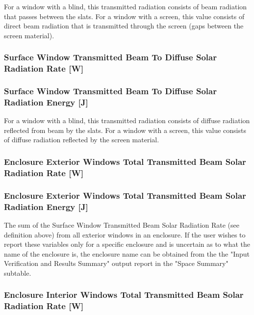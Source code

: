 For a window with a blind, this transmitted radiation consists of beam radiation that passes between the slats. For a window with a screen, this value consists of direct beam radiation that is transmitted through the screen (gaps between the screen material).

\subsubsection{Surface Window Transmitted Beam To Diffuse Solar Radiation Rate {[}W{]}}\label{surface-window-transmitted-beam-to-diffuse-solar-radiation-rate-w}

\subsubsection{Surface Window Transmitted Beam To Diffuse Solar Radiation Energy {[}J{]}}\label{surface-window-transmitted-beam-to-diffuse-solar-radiation-energy-j}

For a window with a blind, this transmitted radiation consists of diffuse radiation reflected from beam by the slats. For a window with a screen, this value consists of diffuse radiation reflected by the screen material.

\subsubsection{Enclosure Exterior Windows Total Transmitted Beam Solar Radiation Rate {[}W{]}}\label{zone-exterior-windows-total-transmitted-beam-solar-radiation-rate-w}

\subsubsection{Enclosure Exterior Windows Total Transmitted Beam Solar Radiation Energy {[}J{]}}\label{zone-exterior-windows-total-transmitted-beam-solar-radiation-energy-j}

The sum of the Surface Window Transmitted Beam Solar Radiation Rate (see definition above) from all exterior windows in an enclosure. If the user wishes to report these variables only for a specific enclosure and is uncertain as to what the name of the enclosure is, the enclosure name can be obtained from the the "Input Verification and Results Summary" output report in the "Space Summary" subtable.

\subsubsection{Enclosure Interior Windows Total Transmitted Beam Solar Radiation Rate {[}W{]}}\label{zone-interior-windows-total-transmitted-beam-solar-radiation-rate-w}

